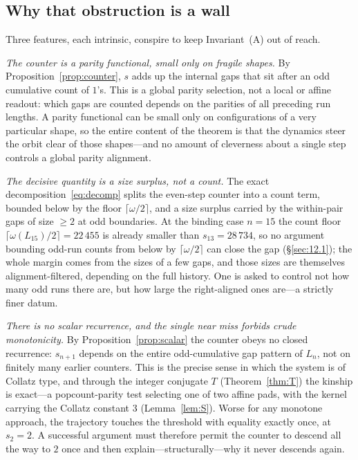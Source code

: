 \documentclass[11pt,reqno]{amsart}
\theoremstyle{plain}
\theoremstyle{definition}
\theoremstyle{remark}
\begin{document}
\subsection{Why that obstruction is a wall}\label{sec:13.2}
Three features, each intrinsic, conspire to keep Invariant~(A) out of reach.

\emph{The counter is a parity functional, small only on fragile shapes.} By Proposition~\ref{prop:counter}, $s$ adds up the internal gaps that sit after an odd cumulative count of $1$'s. This is a global parity selection, not a local or affine readout: which gaps are counted depends on the parities of all preceding run lengths. A parity functional can be small only on configurations of a very particular shape, so the entire content of the theorem is that the dynamics steer the orbit clear of those shapes---and no amount of cleverness about a single step controls a global parity alignment.

\emph{The decisive quantity is a size surplus, not a count.} The exact decomposition~\eqref{eq:decomp} splits the even-step counter into a count term, bounded below by the floor $\lceil\omega/2\rceil$, and a size surplus carried by the within-pair gaps of size $\ge 2$ at odd boundaries. At the binding case $n=15$ the count floor $\lceil\omega(L_{15})/2\rceil=22\,455$ is already smaller than $s_{13}=28\,734$, so no argument bounding odd-run counts from below by $\lceil\omega/2\rceil$ can close the gap (\S\ref{sec:12.1}); the whole margin comes from the sizes of a few gaps, and those sizes are themselves alignment-filtered, depending on the full history. One is asked to control not how many odd runs there are, but how large the right-aligned ones are---a strictly finer datum.

\emph{There is no scalar recurrence, and the single near miss forbids crude monotonicity.} By Proposition~\ref{prop:scalar} the counter obeys no closed recurrence: $s_{n+1}$ depends on the entire odd-cumulative gap pattern of $L_n$, not on finitely many earlier counters. This is the precise sense in which the system is of Collatz type, and through the integer conjugate $T$ (Theorem~\ref{thm:T}) the kinship is exact---a popcount-parity test selecting one of two affine pads, with the kernel carrying the Collatz constant $3$ (Lemma~\ref{lem:S}). Worse for any monotone approach, the trajectory touches the threshold with equality exactly once, at $s_2=2$. A successful argument must therefore permit the counter to descend all the way to $2$ once and then explain---structurally---why it never descends again.
\end{document}
